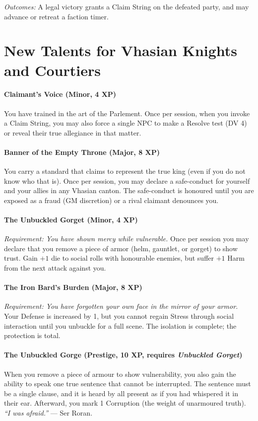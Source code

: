 \documentclass[11pt,twoside]{book}
\begin{document}
\noindent
\textit{Outcomes:} A legal victory grants a Claim String on the defeated party, and may advance or retreat a faction timer.

\section*{New Talents for Vhasian Knights and Courtiers}

\paragraph{Claimant's Voice (Minor, 4 XP)}
You have trained in the art of the Parlement. Once per session, when you invoke a Claim String, you may also force a single NPC to make a Resolve test (DV 4) or reveal their true allegiance in that matter.

\paragraph{Banner of the Empty Throne (Major, 8 XP)}
You carry a standard that claims to represent the true king (even if you do not know who that is). Once per session, you may declare a safe-conduct for yourself and your allies in any Vhasian canton. The safe-conduct is honoured until you are exposed as a fraud (GM discretion) or a rival claimant denounces you.

\paragraph{The Unbuckled Gorget (Minor, 4 XP)}
\textit{Requirement: You have shown mercy while vulnerable.} Once per session you may declare that you remove a piece of armor (helm, gauntlet, or gorget) to show trust. Gain \(+1\) die to social rolls with honourable enemies, but suffer \(+1\) Harm from the next attack against you.

\paragraph{The Iron Bard's Burden (Major, 8 XP)}
\textit{Requirement: You have forgotten your own face in the mirror of your armor.} Your Defense is increased by 1, but you cannot regain Stress through social interaction until you unbuckle for a full scene. The isolation is complete; the protection is total.

\paragraph{The Unbuckled Gorge (Prestige, 10 XP, requires \textit{Unbuckled Gorget})}
When you remove a piece of armour to show vulnerability, you also gain the ability to speak one true sentence that cannot be interrupted. The sentence must be a single clause, and it is heard by all present as if you had whispered it in their ear. Afterward, you mark 1 Corruption (the weight of unarmoured truth). \textit{``I was afraid.''} --- Ser Roran.
\end{document}
